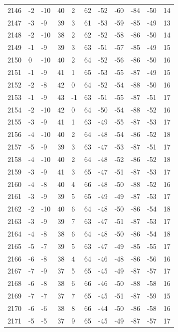 \begin{table}[H]
\begin{tabular}{lllllllllll}
2146 & -2 & -10 & 40 & 2 & 62 & -52 & -60 & -84 & -50 & 14 \\
2147 & -3 & -9 & 39 & 3 & 61 & -53 & -59 & -85 & -49 & 13 \\
2148 & -2 & -10 & 38 & 2 & 62 & -52 & -58 & -86 & -50 & 14 \\
2149 & -1 & -9 & 39 & 3 & 63 & -51 & -57 & -85 & -49 & 15 \\
2150 & 0 & -10 & 40 & 2 & 64 & -52 & -56 & -86 & -50 & 16 \\
2151 & -1 & -9 & 41 & 1 & 65 & -53 & -55 & -87 & -49 & 15 \\
2152 & -2 & -8 & 42 & 0 & 64 & -52 & -54 & -88 & -50 & 16 \\
2153 & -1 & -9 & 43 & -1 & 63 & -51 & -55 & -87 & -51 & 17 \\
2154 & -2 & -10 & 42 & 0 & 64 & -50 & -54 & -88 & -52 & 16 \\
2155 & -3 & -9 & 41 & 1 & 63 & -49 & -55 & -87 & -53 & 17 \\
2156 & -4 & -10 & 40 & 2 & 64 & -48 & -54 & -86 & -52 & 18 \\
2157 & -5 & -9 & 39 & 3 & 63 & -47 & -53 & -87 & -51 & 17 \\
2158 & -4 & -10 & 40 & 2 & 64 & -48 & -52 & -86 & -52 & 18 \\
2159 & -3 & -9 & 41 & 3 & 65 & -47 & -51 & -87 & -53 & 17 \\
2160 & -4 & -8 & 40 & 4 & 66 & -48 & -50 & -88 & -52 & 16 \\
2161 & -3 & -9 & 39 & 5 & 65 & -49 & -49 & -87 & -53 & 17 \\
2162 & -2 & -10 & 40 & 6 & 64 & -48 & -50 & -86 & -54 & 18 \\
2163 & -3 & -9 & 39 & 7 & 63 & -47 & -51 & -87 & -53 & 17 \\
2164 & -4 & -8 & 38 & 6 & 64 & -48 & -50 & -86 & -54 & 18 \\
2165 & -5 & -7 & 39 & 5 & 63 & -47 & -49 & -85 & -55 & 17 \\
2166 & -6 & -8 & 38 & 4 & 64 & -46 & -48 & -86 & -56 & 16 \\
2167 & -7 & -9 & 37 & 5 & 65 & -45 & -49 & -87 & -57 & 17 \\
2168 & -6 & -8 & 38 & 6 & 66 & -46 & -50 & -88 & -58 & 16 \\
2169 & -7 & -7 & 37 & 7 & 65 & -45 & -51 & -87 & -59 & 15 \\
2170 & -6 & -6 & 38 & 8 & 66 & -44 & -50 & -86 & -58 & 16 \\
2171 & -5 & -5 & 37 & 9 & 65 & -45 & -49 & -87 & -57 & 17 \\

\end{tabular}
\end{table}
